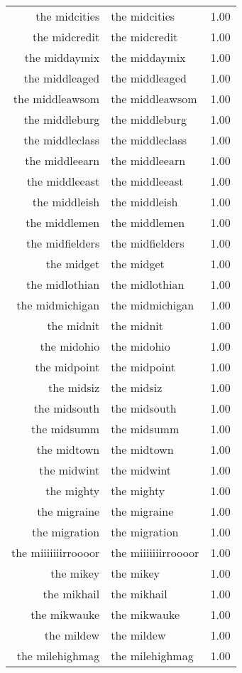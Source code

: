\begin{table}[ht]
\begin{tabular}{rlr}
  the midcities & the midcities & 1.00 \\ 
  the midcredit & the midcredit & 1.00 \\ 
  the middaymix & the middaymix & 1.00 \\ 
  the middleaged & the middleaged & 1.00 \\ 
  the middleawsom & the middleawsom & 1.00 \\ 
  the middleburg & the middleburg & 1.00 \\ 
  the middleclass & the middleclass & 1.00 \\ 
  the middleearn & the middleearn & 1.00 \\ 
  the middleeast & the middleeast & 1.00 \\ 
  the middleish & the middleish & 1.00 \\ 
  the middlemen & the middlemen & 1.00 \\ 
  the midfielders & the midfielders & 1.00 \\ 
  the midget & the midget & 1.00 \\ 
  the midlothian & the midlothian & 1.00 \\ 
  the midmichigan & the midmichigan & 1.00 \\ 
  the midnit & the midnit & 1.00 \\ 
  the midohio & the midohio & 1.00 \\ 
  the midpoint & the midpoint & 1.00 \\ 
  the midsiz & the midsiz & 1.00 \\ 
  the midsouth & the midsouth & 1.00 \\ 
  the midsumm & the midsumm & 1.00 \\ 
  the midtown & the midtown & 1.00 \\ 
  the midwint & the midwint & 1.00 \\ 
  the mighty & the mighty & 1.00 \\ 
  the migraine & the migraine & 1.00 \\ 
  the migration & the migration & 1.00 \\ 
  the miiiiiiirroooor & the miiiiiiirroooor & 1.00 \\ 
  the mikey & the mikey & 1.00 \\ 
  the mikhail & the mikhail & 1.00 \\ 
  the mikwauke & the mikwauke & 1.00 \\ 
  the mildew & the mildew & 1.00 \\ 
  the milehighmag & the milehighmag & 1.00 \\ 

\end{tabular}
\end{table}
